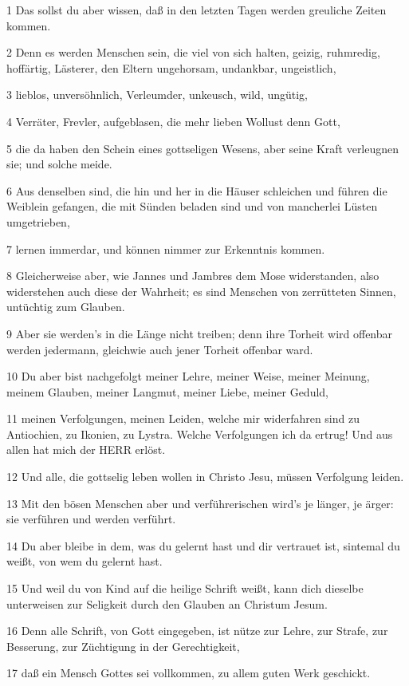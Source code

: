 \par 1 Das sollst du aber wissen, daß in den letzten Tagen werden greuliche Zeiten kommen.
\par 2 Denn es werden Menschen sein, die viel von sich halten, geizig, ruhmredig, hoffärtig, Lästerer, den Eltern ungehorsam, undankbar, ungeistlich,
\par 3 lieblos, unversöhnlich, Verleumder, unkeusch, wild, ungütig,
\par 4 Verräter, Frevler, aufgeblasen, die mehr lieben Wollust denn Gott,
\par 5 die da haben den Schein eines gottseligen Wesens, aber seine Kraft verleugnen sie; und solche meide.
\par 6 Aus denselben sind, die hin und her in die Häuser schleichen und führen die Weiblein gefangen, die mit Sünden beladen sind und von mancherlei Lüsten umgetrieben,
\par 7 lernen immerdar, und können nimmer zur Erkenntnis kommen.
\par 8 Gleicherweise aber, wie Jannes und Jambres dem Mose widerstanden, also widerstehen auch diese der Wahrheit; es sind Menschen von zerrütteten Sinnen, untüchtig zum Glauben.
\par 9 Aber sie werden's in die Länge nicht treiben; denn ihre Torheit wird offenbar werden jedermann, gleichwie auch jener Torheit offenbar ward.
\par 10 Du aber bist nachgefolgt meiner Lehre, meiner Weise, meiner Meinung, meinem Glauben, meiner Langmut, meiner Liebe, meiner Geduld,
\par 11 meinen Verfolgungen, meinen Leiden, welche mir widerfahren sind zu Antiochien, zu Ikonien, zu Lystra. Welche Verfolgungen ich da ertrug! Und aus allen hat mich der HERR erlöst.
\par 12 Und alle, die gottselig leben wollen in Christo Jesu, müssen Verfolgung leiden.
\par 13 Mit den bösen Menschen aber und verführerischen wird's je länger, je ärger: sie verführen und werden verführt.
\par 14 Du aber bleibe in dem, was du gelernt hast und dir vertrauet ist, sintemal du weißt, von wem du gelernt hast.
\par 15 Und weil du von Kind auf die heilige Schrift weißt, kann dich dieselbe unterweisen zur Seligkeit durch den Glauben an Christum Jesum.
\par 16 Denn alle Schrift, von Gott eingegeben, ist nütze zur Lehre, zur Strafe, zur Besserung, zur Züchtigung in der Gerechtigkeit,
\par 17 daß ein Mensch Gottes sei vollkommen, zu allem guten Werk geschickt.

